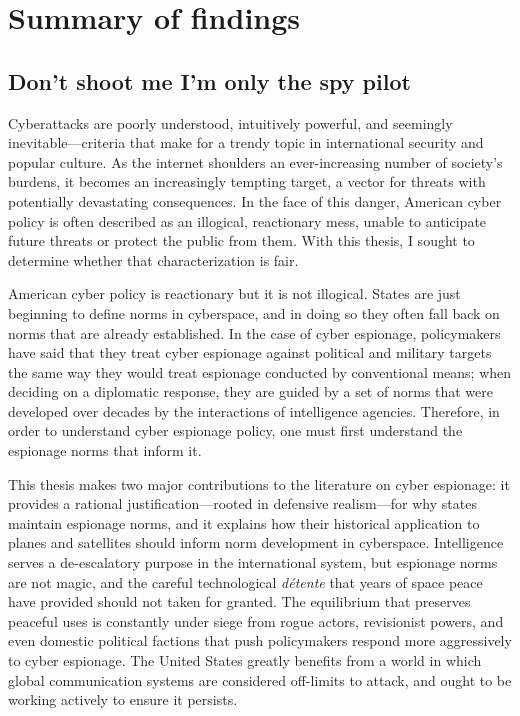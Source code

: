\documentclass[11pt]{memoir}
\begin{document}
\section{Summary of findings}
\subsection{Don't shoot me I'm only the spy pilot}
Cyberattacks are poorly understood, intuitively powerful, and seemingly inevitable---criteria that make for a trendy topic in international security and popular culture. As the internet shoulders an ever-increasing number of society's burdens, it becomes an increasingly tempting target, a vector for threats with potentially devastating consequences. In the face of this danger, American cyber policy is often described as an illogical, reactionary mess, unable to anticipate future threats or protect the public from them. With this thesis, I sought to determine whether that characterization is fair.

American cyber policy is reactionary but it is not illogical. States are just beginning to define norms in cyberspace, and in doing so they often fall back on norms that are already established. In the case of cyber espionage, policymakers have said that they treat cyber espionage against political and military targets the same way they would treat espionage conducted by conventional means; when deciding on a diplomatic response, they are guided by a set of norms that were developed over decades by the interactions of intelligence agencies. Therefore, in order to understand cyber espionage policy, one must first understand the espionage norms that inform it.

This thesis makes two major contributions to the literature on cyber espionage: it provides a rational justification---rooted in defensive realism---for why states maintain espionage norms, and it explains how their historical application to planes and satellites should inform norm development in cyberspace. Intelligence serves a de-escalatory purpose in the international system, but espionage norms are not magic, and the careful technological \emph{d\'etente} that years of space peace have provided should not taken for granted. The equilibrium that preserves peaceful uses is constantly under siege from rogue actors, revisionist powers, and even domestic political factions that push policymakers respond more aggressively to cyber espionage. The United States greatly benefits from a world in which global communication systems are considered off-limits to attack, and ought to be working actively to ensure it persists.
\end{document}
